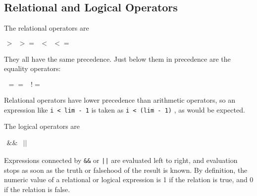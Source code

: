 \subsection{Relational and Logical Operators}

The relational operators are

$\begin{array}{llll}
> & >= & < & <=
\end{array}$

They all have the same precedence. Just below them in precedence are
the equality operators:

$\begin{array}{ll}
== & !=
\end{array}$

Relational operators have lower precedence than arithmetic operators,
so an expression like \texttt{i < lim - 1} is taken as \texttt{i < (lim - 1)}
, as would be expected.

The logical operators are

$\begin{array}{ll}
\&\& & ||
\end{array}$

Expressions connected by \texttt{\&\&} or \texttt{||} are evaluated
left to right, and evaluation stops as soon as the truth or falsehood
of the result is known. By definition, the numeric value of a relational
or logical expression is 1 if the relation is true, and 0 if the relation
is false.
